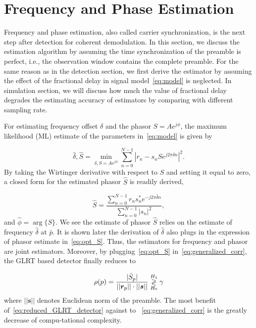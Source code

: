 \section{Frequency and Phase Estimation}%
\label{sec:freq_est}

Frequency and phase estimation, also called carrier synchronization, is the next step after detection for coherent demodulation.
In this section, we discuss the estimation algorithm by assuming the time synchronization of the preamble is perfect, i.e., 
the observation window contains the complete preamble. For the same reason as in the detection section, we first derive the estimator
by assuming the effect of the fractional delay in signal model~\eqref{eq:model} is neglected.
In simulation section, we will discuss how much the value of fractional delay degrades the estimating accuracy of estimators by
comparing with different sampling rate.

For estimating frequency offset $\delta$ and the phasor $S=Ae^{j\phi}$, the maximum likelihood (ML) estimate of the parameters in~\eqref{eq:model} is given by

\begin{equation}
\label{eq:ML_f_S}
  \hat{\delta},\hat{S}=\min_{\delta,S=Ae^{j\phi}}\sum_{n=0}^{N-1}|r_n-s_nSe^{j2\pi\delta n}|^{2}.
\end{equation}
By taking the Wirtinger derivative with respect to $S$ and setting it equal to zero, a 
closed form for the estimated phasor $\hat{S}$ is readily derived,

\begin{equation}
    \label{eq:opt_S}
    \hat{S}=\frac{\sum_{n=0}^{N-1}{r_{n}s_n^{*}e^{-j2\pi\hat{\delta} n}}}{\sum_{n=0}^{N-1}|s_{n}|^2},
  \end{equation}
and $\hat{\phi}=\arg\{S\}$. We see the estimate of phasor $\hat{S}$ relies on the estimate of frequency $\hat{\delta}$ at $\bar{p}$.
It is shown later the derivation of $\hat{\delta}$ also plugs in the expression of phasor estimate in~\eqref{eq:opt_S}. Thus, the estimators for frequency and phasor are
joint estimators. Moreover, by plugging~\eqref{eq:opt_S} in~\eqref{eq:generalized_corr}, the GLRT based detector finally reduces to

\begin{equation}
  \label{eq:reduced_GLRT_detector}
  \rho(p)=
  \frac{|\hat{S}_p|}
  {||\bm{r}_{p}||\cdot||\bm{s}||} \mathrel{\mathop\gtrless\limits^{H_1}_{H_0}} \gamma
\end{equation}
where $||\bm{s}||$ denotes Euclidean norm of the preamble. The most benefit of~\eqref{eq:reduced_GLRT_detector} against to
~\eqref{eq:generalized_corr} is the greatly decrease of compu-tational complexity.

